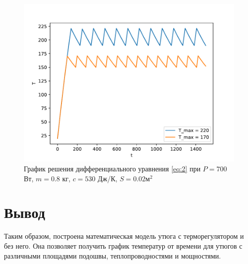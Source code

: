 \documentclass[a4paper, 14pt]{extarticle}
\begin{document}
			\begin{figure}[H]
				\centering
				\includegraphics[width = .65\linewidth]{fig6.pdf}
				\caption[.] {График решения дифференциального уравнения \eqref{eq:2} 
					при $P = 700$ Вт, $m = 0.8$ кг, $c = 530$ Дж/К, $S = 0.02 \text{м}^2$}
			\end{figure}
			
	\section{Вывод}
		Таким образом, построена математическая модель утюга с терморегулятором и без него. Она позволяет получить график температур от времени для утюгов с различными площадями подошвы, теплопроводностями и мощностями. 
		
\end{document}
